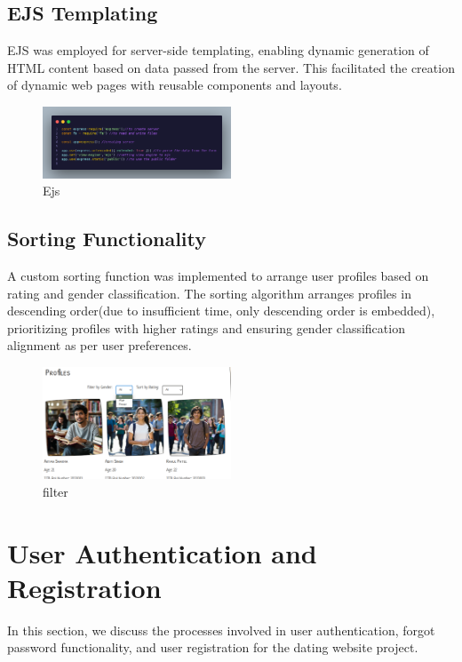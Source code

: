 \documentclass{article}
\begin{document}
\subsection{\textbf{EJS Templating}} EJS was employed for server-side templating, enabling dynamic generation of HTML content based on data passed from the server. This facilitated the creation of dynamic web pages with reusable components and layouts.

\begin{figure}[htbp] 
    \centering 
    \includegraphics[width=0.5\textwidth]{codeesj.png} 
    \caption{Ejs} 
    \label{Ejs} 
\end{figure}

  \subsection{\textbf{Sorting Functionality}} A custom sorting function was implemented to arrange user profiles based on rating and gender classification. The sorting algorithm arranges profiles in descending order(due to insufficient time, only descending order is embedded), prioritizing profiles with higher ratings and ensuring gender classification alignment as per user preferences.
    
\begin{figure}[htbp] 
    \centering 
    \includegraphics[width=0.5\textwidth]{filter.png} 
    \caption{filter} 
    \label{filter} 
    \end{figure}
\section{User Authentication and Registration}

In this section, we discuss the processes involved in user authentication, forgot password functionality, and user registration for the dating website project.
\end{document}
